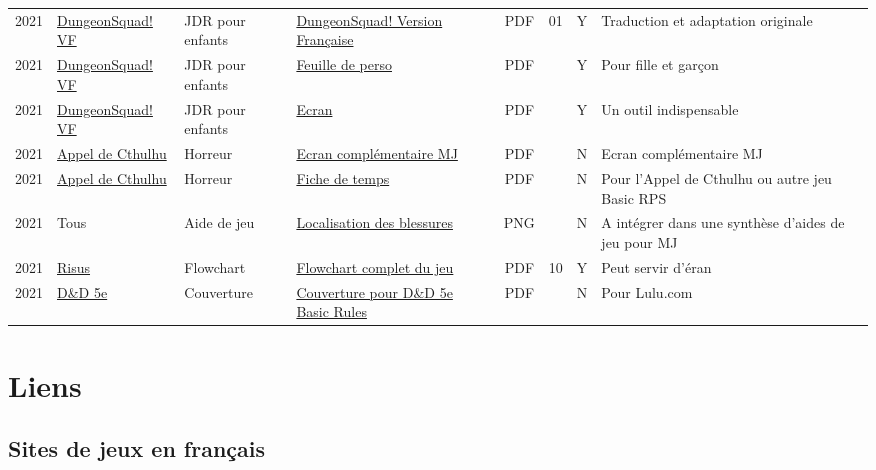 \documentclass[a4paper, 11pt, twoside]{article}
\begin{document}
\begin{longtable}{p{0.6cm}p{2cm}p{1.5cm}p{4cm}cccp{3.8cm}}
2021 & \href{https://github.com/orey/jdr-dungeon-squad-fr}{DungeonSquad! VF} & JDR pour enfants & \href{https://rouboudou.itch.io/dungeonsquad-fr}{DungeonSquad! Version Française} & PDF & 01 & Y & Traduction et adaptation originale\\
2021 & \href{https://github.com/orey/jdr-dungeon-squad-fr}{DungeonSquad! VF} & JDR pour enfants & \href{https://rouboudou.itch.io/dungeonsquad-fr}{Feuille de perso} & PDF &  & Y & Pour fille et garçon\\
2021 & \href{https://github.com/orey/jdr-dungeon-squad-fr}{DungeonSquad! VF} & JDR pour enfants & \href{https://rouboudou.itch.io/dungeonsquad-fr}{Ecran} & PDF &  & Y & Un outil indispensable\\
2021 & \href{https://github.com/orey/jdr/tree/master/AppelDeCthulhu}{Appel de Cthulhu} & Horreur & \href{https://github.com/orey/jdr/blob/master/AppelDeCthulhu/AppelDeCthulhu-EcranComplementaire.pdf}{Ecran complémentaire MJ} & PDF &  & N & Ecran complémentaire MJ\\
2021 & \href{https://github.com/orey/jdr/tree/master/AppelDeCthulhu}{Appel de Cthulhu} & Horreur & \href{https://github.com/orey/jdr/blob/master/AppelDeCthulhu/AppelDeCthulhu-FicheDeTemps.pdf}{Fiche de temps} & PDF &  & N & Pour l'Appel de Cthulhu ou autre jeu Basic RPS\\
2021 & Tous & Aide de jeu & \href{https://github.com/orey/jdr/blob/master/Aftermath/LocalisationDesBlessures.png}{Localisation des blessures} & PNG &  & N & A intégrer dans une synthèse d'aides de jeu pour MJ\\
2021 & \href{https://github.com/orey/jdr-risus}{Risus} & Flowchart & \href{https://rouboudou.itch.io/risus-ressources}{Flowchart complet du jeu} & PDF & 10 & Y & Peut servir d'éran\\
2021 & \href{https://github.com/orey/DandD}{D\&D 5e} & Couverture & \href{https://github.com/orey/DandD/blob/master/DandD\_5e\_BasicEditionLuluCover/Cover.pdf}{Couverture pour D\&D 5e Basic Rules} & PDF &  & N & Pour Lulu.com\\
\end{longtable}

\section{Liens}
\label{sec:orgbeb4838}

\subsection{Sites de jeux en français}
\label{sec:org4e6eb60}
\end{document}
